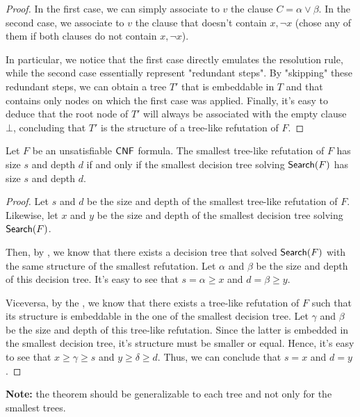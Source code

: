 \begin{proof}
    In the first case, we can simply associate to $v$ the clause $C = \alpha \lor \beta$.  In the second case, we associate to $v$ the clause that doesn't contain $x, \lnot{x}$ (chose any of them if both clauses do not contain $x, \lnot{x}$).

    In particular, we notice that the first case directly emulates the resolution rule, while the second case essentially represent "redundant steps". By "skipping" these redundant steps, we can obtain a tree $T'$ that is embeddable in $T$ and that contains only nodes on which the first case was applied. Finally, it's easy to deduce that the root node of $T'$ will always be associated with the empty clause $\bot$, concluding that $T'$ is the structure of a tree-like refutation of $F$.

\end{proof}

\begin{theorem}
Let $F$ be an unsatisfiable $\mathsf{CNF}$ formula. The smallest tree-like refutation of $F$ has size $s$ and depth $d$ if and only if the smallest decision tree solving $\mathsf{Search}(F)$ has size $s$ and depth $d$.
\end{theorem}

\begin{proof}
    Let $s$ and $d$ be the size and depth of the smallest tree-like refutation of $F$. Likewise, let $x$ and $y$ be the size and depth of the smallest decision tree solving $\mathsf{Search}(F)$.

    Then, by , we know that there exists a decision tree that solved $\mathsf{Search}(F)$ with the same structure of the smallest refutation. Let $\alpha$ and $\beta$ be the size and depth of this decision tree. It's easy to see that $s = \alpha \geq x$ and $d = \beta \geq y$.

    Viceversa, by the , we know that there exists a tree-like refutation of $F$ such that its structure is embeddable in the one of the smallest decision tree. Let $\gamma$ and $\beta$ be the size and depth of this tree-like refutation. Since the latter is embedded in the smallest decision tree, it's structure must be smaller or equal. Hence, it's easy to see that $x \geq \gamma \geq s$ and $y \geq \delta \geq d$. Thus, we can conclude that $s = x$ and $d = y$.

\end{proof}

\textbf{Note:} the theorem should be generalizable to each tree and not only for the smallest trees.

